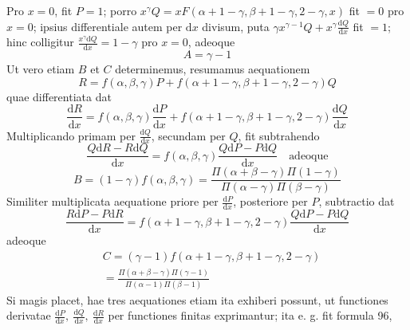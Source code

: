 Pro \(x=0\), fit \(P=1\); porro \(x^\gamma Q=xF(\alpha+1-\gamma,\beta+1-\gamma,2-\gamma,x)\) fit \(=0\) pro \(x=0\); ipsius differentiale autem per \(\mathrm dx\) divisum, puta \(\gamma x^{\gamma-1}Q+x^\gamma\frac{\mathrm dQ}{\mathrm dx}\) fit \(=1\); hinc colligitur \(\frac{x^\gamma\mathrm dQ}{\mathrm dx}=1-\gamma\) pro \(x=0\), adeoque
\[
A=\gamma-1
\]
Ut vero etiam \(B\) et \(C\) determinemus, resumamus aequationem
\[
R=f(\alpha,\beta,\gamma)P+f(\alpha+1-\gamma,\beta+1-\gamma,2-\gamma)Q
\]
quae differentiata dat
\[
\frac{\mathrm dR}{\mathrm dx}=f(\alpha,\beta,\gamma)\frac{\mathrm dP}{\mathrm dx}+f(\alpha+1-\gamma,\beta+1-\gamma,2-\gamma)\frac{\mathrm dQ}{\mathrm dx}
\]
Multiplicando primam per \(\frac{\mathrm dQ}{\mathrm dx}\), secundam per \(Q\), fit subtrahendo
\[
\frac{Q\mathrm dR-R\mathrm dQ}{\mathrm dx}=f(\alpha,\beta,\gamma)\frac{Q\mathrm dP-P\mathrm dQ}{\mathrm dx}\quad\mbox{adeoque}
\]
\[
B=(1-\gamma)f(\alpha,\beta,\gamma)=\frac{\Pi(\alpha+\beta-\gamma)\Pi(1-\gamma)}{\Pi(\alpha-\gamma)\Pi(\beta-\gamma)}
\]
Similiter multiplicata aequatione priore per \(\frac{\mathrm dP}{\mathrm dx}\), posteriore per \(P\), subtractio dat
\[
\frac{R\mathrm dP-P\mathrm dR}{\mathrm dx}=f(\alpha+1-\gamma,\beta+1-\gamma,2-\gamma)\frac{Q\mathrm dP-P\mathrm dQ}{\mathrm dx}
\]
adeoque
\[
\begin{aligned}&C=(\gamma-1)f(\alpha+1-\gamma,\beta+1-\gamma,2-\gamma)\\&=\frac{\Pi(\alpha+\beta-\gamma)\Pi(\gamma-1)}{\Pi(\alpha-1)\Pi(\beta-1)}\end{aligned}
\]
Si magis placet, hae tres aequationes etiam ita exhiberi possunt, ut functiones derivatae \(\frac{\mathrm dP}{\mathrm dx},\ \frac{\mathrm dQ}{\mathrm dx},\ \frac{\mathrm dR}{\mathrm dx}\) per functiones finitas exprimantur; ita e. g. fit formula 96,
